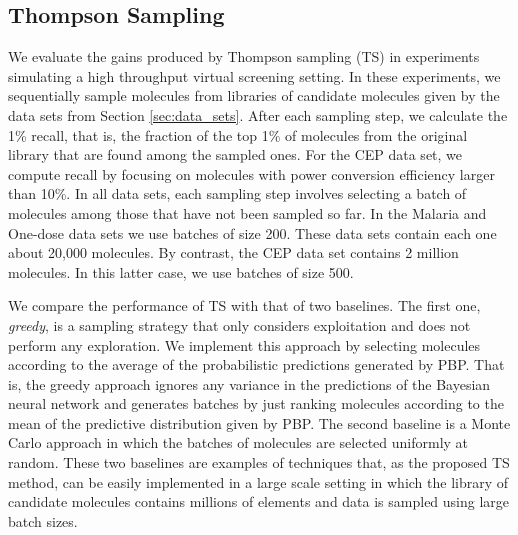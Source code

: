 \subsection{Thompson Sampling}

We evaluate the gains produced by Thompson sampling (TS) in experiments simulating a high throughput virtual screening setting. In these experiments, we sequentially sample molecules from libraries of candidate molecules given by the data sets from Section \ref{sec:data_sets}. After each sampling step, we calculate the 1\% recall, that is, the fraction of the top 1\% of molecules from the original library that are found among the sampled ones. For the CEP data set, we compute recall by focusing on molecules with power conversion efficiency larger than 10\%. In all data sets, each sampling step involves selecting a batch of molecules among those that have not been sampled so far. In the Malaria and One-dose data sets we use batches of size 200. These data sets contain each one about 20,000 molecules. By contrast, the CEP data set contains 2 million molecules. In this latter case, we use batches of size 500. 

We compare the performance of TS with that of two baselines. The first one, \emph{greedy}, is a sampling strategy that only considers exploitation and does not perform any exploration. We implement this approach by selecting molecules according to the average of the probabilistic predictions generated by PBP. That is, the greedy approach ignores any variance in the predictions of the Bayesian neural network and generates batches by just ranking molecules according to the mean of the predictive distribution given by PBP. The second baseline is a Monte Carlo approach in which the batches of molecules are selected uniformly at random. These two baselines are examples of techniques that, as the proposed TS method, can be easily implemented in a large scale setting in which the library of candidate molecules contains millions of elements and data is sampled using large batch sizes.

